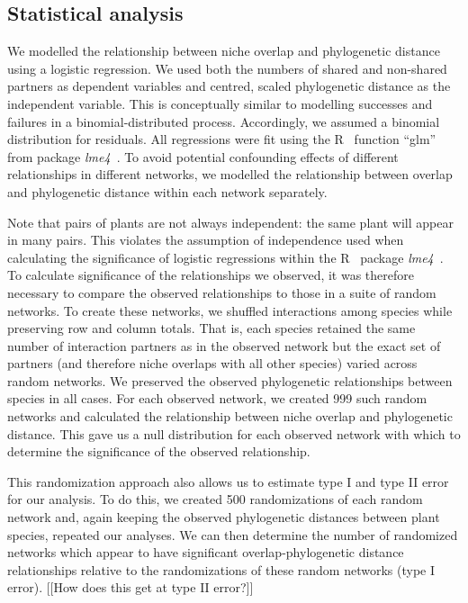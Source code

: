 \documentclass[12pt]{article}
\begin{document}
\begin{spacing}{1.5}


\subsection*{Statistical analysis} 

  We modelled the relationship between niche overlap and phylogenetic distance
  using a logistic regression. We used both the numbers of shared and 
  non-shared partners as dependent variables and centred, scaled phylogenetic 
  distance as the independent variable. This is conceptually similar to 
  modelling successes and failures in a binomial-distributed process. 
  Accordingly, we assumed a binomial distribution for residuals. All regressions were fit using the R~\citep{R} function 
  ``glm'' from package \emph{lme4}~\citep{lme4}. To avoid potential 
  confounding effects of different relationships in different networks, we 
  modelled the relationship between overlap and phylogenetic distance within 
  each network separately. 


  Note that pairs of plants are not always independent: the same plant will
  appear in many pairs. This violates the assumption of independence used when 
  calculating the significance of logistic regressions within the R~\citep{R} 
  package \emph{lme4}~\citep{lme4}. To calculate significance of the 
  relationships we observed, it was therefore necessary to compare the 
  observed relationships to those in a suite of random networks. To create 
  these networks, we shuffled interactions among species while preserving row 
  and column totals. That is, each species retained the same number of 
  interaction partners as in the observed network but the exact set of 
  partners (and therefore niche overlaps with all other species) varied across 
  random networks. We preserved the observed phylogenetic relationships 
  between species in all cases. For each observed network, we created 999 such 
  random networks and calculated the relationship between niche overlap and 
  phylogenetic distance. This gave us a null distribution for each observed 
  network with which to determine the significance of the observed 
  relationship.


  This randomization approach also allows us to estimate type I and type II 
  error for our analysis. To do this, we created 500 randomizations of each 
  random network and, again keeping the observed phylogenetic distances 
  between plant species, repeated our analyses. We can then determine the 
  number of randomized networks which appear to have significant 
  overlap-phylogenetic distance relationships relative to the randomizations 
  of these random networks (type I error). [[How does this get at type II error?]] 



\end{spacing}
\end{document}
